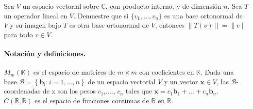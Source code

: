 \documentclass[addpoints,answers,10pt]{exam}
\providecommand{\lrSet}[1]{\left\{#1\right\}}
\providecommand{\lrRound}[1]{\left(#1\right)}
\providecommand{\norm}[1]{\lVert#1\rVert}
\begin{document}
\begin{questions}

\question[20] Sea $V$ un espacio vectorial sobre $\mathbb{C}$,  con producto interno, y de dimensi\'on $n$. Sea $T$ un operador lineal en $V$. Demuestre que si $\{v_1,\dots ,v_n\}$ es una base ortonormal de $V$ y su imagen bajo $T$ es otra base ortonormal de $V$, entonces $\norm{T(v)}=\norm{v}$ para todo $v\in V$.






\end{questions}


\paragraph{Notación y definiciones.} 
$M_{m}\lrRound{\mathbb{K}}$ es el espacio de matrices de $m\times m$  con coeficientes en $\mathbb{K}$.   Dada una base $\mathcal{B}=\lrSet{\mathbf{b}_{i}:i=1,...,n}$ de un espacio vectorial $V$ y un vector $\mathbf{x}\in V$, las $\mathcal{B}$-coordenadas de x son los pesos $c_{1}$,...., $c_{n}$ tales que $\mathbf{x}= c_{1}\mathbf{b}_{1}+\ldots+c_{n}\mathbf{b}_{n}$. $C(\mathbb{R},\mathbb{R}) $ es el espacio de funciones contínuas de $\mathbb{R}$ en $\mathbb{R}$. 
\end{document}
